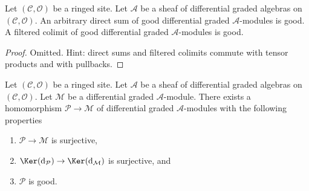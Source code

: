 \begin{lemma}
\label{lemma-good-direct-sum}
Let $(\mathcal{C}, \mathcal{O})$ be a ringed site.
Let $\mathcal{A}$ be a sheaf of differential graded algebras
on $(\mathcal{C}, \mathcal{O})$. An arbitrary
direct sum of good differential graded $\mathcal{A}$-modules
is good. A filtered colimit of good differential graded
$\mathcal{A}$-modules is good. 
\end{lemma}

\begin{proof}
Omitted. Hint: direct sums and filtered colimits
commute with tensor products and with pullbacks.
\end{proof}

\begin{lemma}
\label{lemma-good-quotient}
Let $(\mathcal{C}, \mathcal{O})$ be a ringed site.
Let $\mathcal{A}$ be a sheaf of differential graded algebras
on $(\mathcal{C}, \mathcal{O})$. Let $\mathcal{M}$
be a differential graded $\mathcal{A}$-module. There exists a homomorphism
$\mathcal{P} \to \mathcal{M}$ of differential graded $\mathcal{A}$-modules
with the following properties
\begin{enumerate}
\item $\mathcal{P} \to \mathcal{M}$ is surjective,
\item $\Ker(\text{d}_\mathcal{P}) \to \Ker(\text{d}_\mathcal{M})$
is surjective, and
\item $\mathcal{P}$ is good.
\end{enumerate}
\end{lemma}

